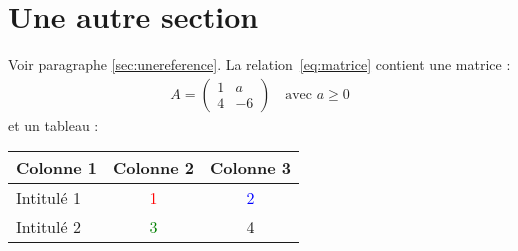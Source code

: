 \documentclass[a4paper, french, twoside]{article}
\begin{document}
\section{Une autre section}
Voir paragraphe \ref{sec:unereference}. La relation~\eqref{eq:matrice} contient une matrice :
    \begin{align}
    A =
    \begin{pmatrix}
    1 & a \\
    4 & -6
    \end{pmatrix}
    \quad\text{avec $a\geqslant 0$}\label{eq:matrice}
    \end{align}
et un tableau :
    \begin{center}
    \begin{tabular}{l|c|c}
    Colonne 1  & Colonne 2 & Colonne 3 \\
    \hline
    Intitulé 1 & \textcolor{red}{1} & \textcolor{blue}{2} \\
    Intitulé 2 & \textcolor{green}{3} & 4
    \end{tabular}
    \end{center}
\end{document}
